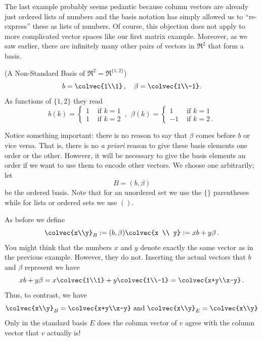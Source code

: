 The last example probably seems pedantic because column vectors are already just ordered lists of numbers and the basis notation 
has simply allowed us to ``re-express'' these as lists of numbers. Of course, this objection does not apply to more complicated vector spaces like our first matrix example. Moreover, as we saw \hypertarget{nonstandard r2 basis}{earlier}, there are infinitely many other pairs of vectors in $\Re^2$ that form a basis.

\begin{example}(A Non-Standard Basis of $\Re^2=\Re^{\{1,2\}}$)\\
\[
b=\colvec{1\\1}\, ,\quad \beta=\colvec{1\\-1}.
\]
As functions of $\{1,2\}$ they read
\begin{displaymath}
   b (k)= \left\{
     \begin{array}{lr}
       1 & \text{~if~} k=1\\
       1 & \text{~if~} k=2
     \end{array}
   \right. \, ,~~
   \beta (k)= \left\{
     \begin{array}{rl}
       1 & \text{~if~} k=1\\
       -1 & \text{~if~} k=2\, .
     \end{array}
   \right.
\end{displaymath} 

Notice something important: there is no reason to say that $\beta$ comes before $b$ or vice versa. That is, there is no {\itshape a priori} reason to give these basis elements one order or the other. 
However, it will be necessary to give the basis elements an order if we want to use them to encode other vectors.  We choose one arbitrarily; let \[B=(b,\beta)\] be the ordered basis. Note that for an unordered set we use the $\{\}$ parentheses while for lists or ordered sets we use $()$. 

As before we define 
\[
\colvec{x\\y}_B :=(b,\beta)\colvec{x \\ y}:= xb+ y \beta\, . 
\]
You might think that the numbers $x$ and $y$ denote exactly the same vector as in the previous example. However, they do not. Inserting
the actual vectors that $b$ and $\beta$ represent we have
\[
xb+ y \beta=x\colvec{1\\1}+y\colvec{1\\-1}=\colvec{x+y\\x-y}\, .
\]
Thus, to contrast, we have
\[
\colvec{x\\y}_B=\colvec{x+y\\x-y} \mbox{ and } \colvec{x\\y}_E=\colvec{x\\y}
\]
Only in the standard basis $E$ does the column vector of $v$ agree with the column vector that $v$ actually is!


\end{example}
